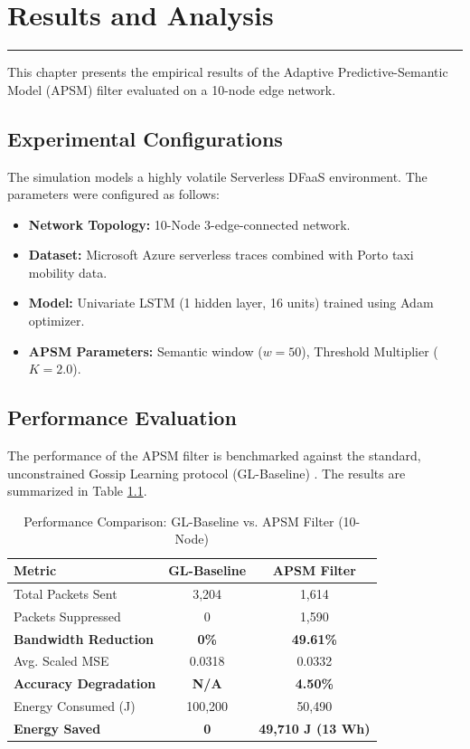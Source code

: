 \chapter{Results and Analysis}
\noindent \rule{6.6in}{0.01in}
\vspace{0.2cm}

This chapter presents the empirical results of the Adaptive Predictive-Semantic Model (APSM) filter evaluated on a 10-node edge network.

\section{Experimental Configurations}
The simulation models a highly volatile Serverless DFaaS environment. The parameters were configured as follows:
\begin{itemize}
    \item \textbf{Network Topology:} 10-Node 3-edge-connected network.
    \item \textbf{Dataset:} Microsoft Azure serverless traces combined with Porto taxi mobility data.
    \item \textbf{Model:} Univariate LSTM (1 hidden layer, 16 units) trained using Adam optimizer.
    \item \textbf{APSM Parameters:} Semantic window ($w=50$), Threshold Multiplier ($K=2.0$).
\end{itemize}

\section{Performance Evaluation}
The performance of the APSM filter is benchmarked against the standard, unconstrained Gossip Learning protocol (GL-Baseline) \cite{tundo2025decentralized}. The results are summarized in Table \ref{tab:comparison_results}.

\begin{table}[!ht]
\centering
\caption{Performance Comparison: GL-Baseline vs. APSM Filter (10-Node)}
\label{tab:comparison_results}
\renewcommand{\arraystretch}{1.2}
\begin{tabular}{|l|c|c|}
\hline
\textbf{Metric} & \textbf{GL-Baseline} & \textbf{APSM Filter} \\ \hline
Total Packets Sent & 3,204 & 1,614 \\ \hline
Packets Suppressed & 0 & 1,590 \\ \hline
\textbf{Bandwidth Reduction} & \textbf{0\%} & \textbf{49.61\%} \\ \hline
Avg. Scaled MSE & 0.0318 & 0.0332 \\ \hline
\textbf{Accuracy Degradation} & \textbf{N/A} & \textbf{4.50\%} \\ \hline
Energy Consumed (J) & 100,200 & 50,490 \\ \hline
\textbf{Energy Saved} & \textbf{0} & \textbf{49,710 J (13 Wh)} \\ \hline
\end{tabular}
\end{table}

